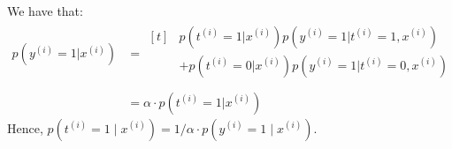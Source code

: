 \begin{answer}
We have that:
\begin{align}
	p(y^{(i)} = 1|x^{(i)})
	&= \begin{aligned}[t]
	& p(t^{(i)} = 1|x^{(i)}) p(y^{(i)} = 1|t^{(i)} = 1, x^{(i)}) \\
	& + p(t^{(i)} = 0|x^{(i)}) p(y^{(i)} = 1|t^{(i)} = 0, x^{(i)}) \\
	\end{aligned} \\
	&= \alpha \cdot p(t^{(i)} = 1|x^{(i)})	
\end{align}
Hence, $p(t^{(i)} = 1\mid x^{(i)}) = 1/\alpha \cdot p(y^{(i)} = 1\mid x^{(i)})$. \\
\end{answer}
